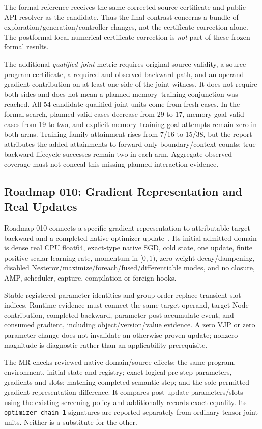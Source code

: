 \documentclass[conference]{IEEEtran}
\begin{document}
The formal reference receives the same corrected source certificate and public API resolver as the candidate. Thus the final contrast concerns a bundle of exploration/generation/controller changes, not the certificate correction alone. The postformal local numerical certificate correction is \emph{not} part of these frozen formal results.

The additional \emph{qualified joint} metric requires original source validity, a source program certificate, a required and observed backward path, and an operand-gradient contribution on at least one side of the joint witness. It does not require both sides and does not mean a planned memory--training conjunction was reached. All 54 candidate qualified joint units come from fresh cases. In the formal search, planned-valid cases decrease from 29 to 17, memory-goal-valid cases from 19 to two, and explicit memory--training goal attempts remain zero in both arms. Training-family attainment rises from 7/16 to 15/38, but the report attributes the added attainments to forward-only boundary/context counts; true backward-lifecycle successes remain two in each arm. Aggregate observed coverage must not conceal this missing planned interaction evidence.

\subsection{Roadmap 010: Gradient Representation and Real Updates}
Roadmap 010 connects a specific gradient representation to attributable target backward and a completed native optimizer update~\cite{rm010}. Its initial admitted domain is dense real CPU float64, exact-type native SGD, cold state, one update, finite positive scalar learning rate, momentum in $[0,1)$, zero weight decay/dampening, disabled Nesterov/maximize/foreach/fused/differentiable modes, and no closure, AMP, scheduler, capture, compilation or foreign hooks.

Stable registered parameter identities and group order replace transient slot indices. Runtime evidence must connect the same target operand, target Node contribution, completed backward, parameter post-accumulate event, and consumed gradient, including object/version/value evidence. A zero VJP or zero parameter change does not invalidate an otherwise proven update; nonzero magnitude is diagnostic rather than an applicability prerequisite.

The MR checks reviewed native domain/source effects; the same program, environment, initial state and registry; exact logical pre-step parameters, gradients and slots; matching completed semantic step; and the sole permitted gradient-representation difference. It compares post-update parameters/slots using the existing screening policy and additionally records exact equality. Its \texttt{optimizer-chain-1} signatures are reported separately from ordinary tensor joint units. Neither is a substitute for the other.
\end{document}
